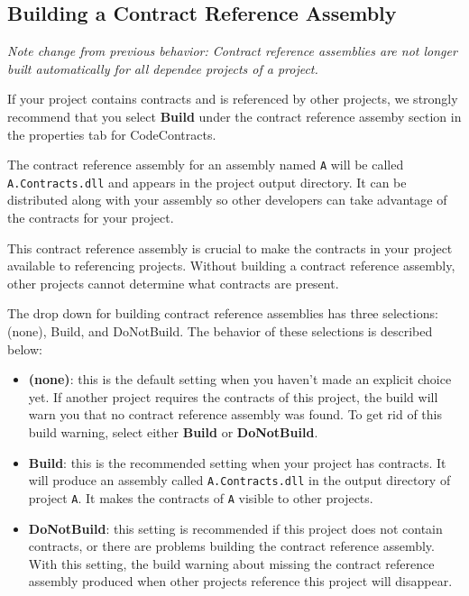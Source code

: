 \documentclass{article}
\newcommand{\code}[1]{\lstinline{#1}}
\begin{document}
\subsection{Building a Contract Reference Assembly}
\label{sec:contractreferenceassemblies}
\emph{Note change from previous behavior: Contract reference
  assemblies are not longer built automatically for all
  dependee projects of a project.}

If your project contains contracts and is referenced by other
projects, we strongly recommend that you select \textbf{Build} under
the contract reference assemby section in the properties tab for
CodeContracts. 

The contract reference assembly for an assembly named \code{A} will be
called \code{A.Contracts.dll} and appears in the project output
directory. It can be distributed along with your assembly so other
developers can take advantage of the contracts for your project.

This contract reference assembly is crucial to make the contracts in
your project available to referencing projects. Without building a
contract reference assembly, other projects cannot determine what
contracts are present.

The drop down for building contract reference assemblies has three
selections: (none), Build, and DoNotBuild. The behavior of these
selections is described below:
\begin{itemize}
\item \textbf{(none)}: this is the default setting when you haven't
  made an explicit choice yet. If another project requires the
  contracts of this project, the build will warn you that no contract
  reference assembly was found. To get rid of this build warning,
  select either \textbf{Build} or \textbf{DoNotBuild}.

\item \textbf{Build}: this is the recommended setting when your
  project has contracts. It will produce
  an assembly called \code{A.Contracts.dll} in the output directory of
  project \code{A}. It makes the contracts of \code{A} visible to
  other projects.

\item \textbf{DoNotBuild}: this setting is recommended if this project
  does not contain contracts, or there are problems building the
  contract reference assembly. With this setting, the build warning
  about missing the contract reference assembly produced when other
  projects reference this project will disappear.
\end{itemize}
\end{document}
